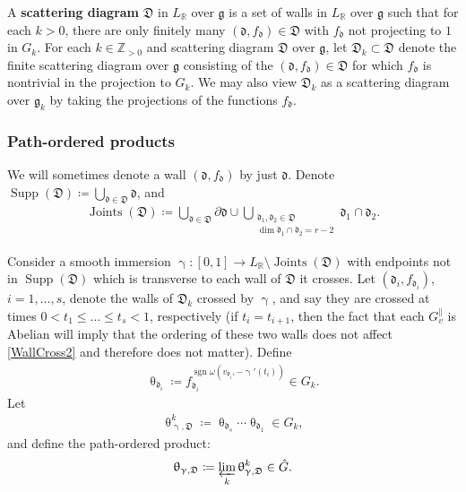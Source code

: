 \documentclass{amsart}
\DeclareMathOperator{\sign}{sgn}
\DeclareMathOperator{\Joints}{Joints}
\DeclareMathOperator{\Supp}{Supp}
\let\bb=\mathbb
\let\rar=\rightarrow
\let\f=\mathfrak
\renewcommand{\theta}{\uptheta}
\renewcommand{\gamma}{\upgamma}
\theoremstyle{plain}%
\theoremstyle{definition}
\theoremstyle{remark}
\begin{document}
A \textbf{scattering diagram} $\f{D}$ in $L_{\bb{R}}$ over $\f{g}$ 
is a set of walls in $L_{\bb{R}}$ over $\f{g}$ such that for each $k >0$, there are only finitely many $(\f{d},f_{\f{d}})\in \f{D}$ with $f_{\f{d}}$ not projecting to $1$ in $G_k$.  For each $k\in \bb{Z}_{>0}$ and scattering diagram $\f{D}$ over $\f{g}$, let $\f{D}_k\subset \f{D}$ denote the finite scattering diagram over $\f{g}$ consisting of the $(\f{d},f_{\f{d}})\in \f{D}$ for which $f_{\f{d}}$ is nontrivial in the projection to $G_k$.  We may also view $\f{D}_k$ as a scattering diagram over $\f{g}_k$ by taking the projections of the functions $f_{\f{d}}$.

\subsubsection{Path-ordered products}
\label{pop_sec}
We will sometimes denote a wall $(\f{d},f_{\f{d}})$ by just $\f{d}$.  Denote $\Supp(\f{D})\coloneqq  \bigcup_{\f{d}\in \f{D}} \f{d}$, and \begin{align}\label{joints}
\Joints(\f{D})\coloneqq  \bigcup_{\f{d}\in \f{D}} \partial \f{d} \cup \bigcup_{\substack{\f{d}_1,\f{d}_2\in \f{D}\\
		               \dim \f{d}_1\cap \f{d}_2 = r-2}} \f{d}_1\cap \f{d}_2. 
\end{align}

Consider a smooth immersion $\gamma\colon [0,1]\rar L_{\bb{R}}\setminus \Joints(\f{D})$ with endpoints not in $\Supp(\f{D})$ which is transverse to each wall of $\f{D}$ it crosses.  Let $(\f{d}_i,f_{\f{d}_i})$, $i=1,\ldots, s$, denote the walls of $\f{D}_k$ crossed by $\gamma$, and say they are crossed at times $0<t_1\leq \ldots \leq t_s<1$, respectively (if $t_i=t_{i+1}$, then the fact that each $G_v^{\parallel}$ is Abelian will imply that the ordering of these two walls does not affect \eqref{WallCross2} and therefore does not matter).  Define 
\begin{align}\label{WallCross}
\theta_{\f{d}_i}\coloneqq f_{\f{d}_i}^{\sign \omega(v_{\f{d}_i},-\gamma'(t_i))} \in G_k.
\end{align}
Let 
\begin{align}\label{WallCross2}
    \theta_{\gamma,\f{D}}^k\coloneqq \theta_{\f{d}_s} \cdots \theta_{\f{d}_1}\in G_k,
\end{align} and define the path-ordered product:
\begin{align}\label{pathprod}
\theta_{\gamma,\f{D}}\coloneqq  \varprojlim_k \theta_{\gamma,\f{D}}^k \in \hat{G}.
\end{align}
\end{document}
